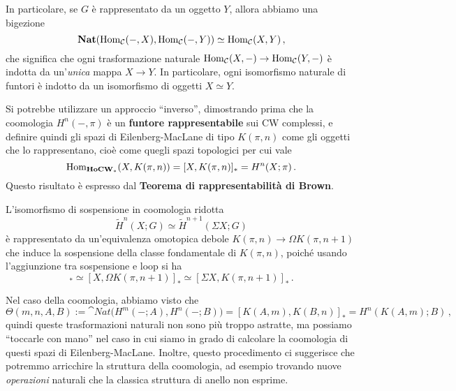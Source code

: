 In particolare, se $G$ è rappresentato da un oggetto $Y$,
allora abbiamo una bigezione
\begin{equation*}
	{\normalfont\textbf{Nat}}(\operatorname{Hom}_{\mathcal{C}}(-,X), \operatorname{Hom}_{\mathcal{C}}(-,Y)) \simeq \operatorname{Hom}_{\mathcal{C}}(X,Y)\,,
\end{equation*}
che significa che ogni trasformazione naturale $\operatorname{Hom}_{\mathcal{C}}(X,-) \to \operatorname{Hom}_{\mathcal{C}}(Y,-)$
è indotta da un'\emph{unica} mappa $X \to Y$.
In particolare, ogni isomorfismo naturale di funtori è indotto
da un isomorfismo di oggetti $X \simeq Y$.


\begin{fact}
Si potrebbe utilizzare un approccio ``inverso'',
dimostrando prima che la coomologia $H^{n}(-,\pi)$
è un \textbf{funtore rappresentabile} sui CW complessi,
e definire quindi gli spazi di Eilenberg-MacLane di tipo
$K(\pi,n)$ come gli oggetti che lo rappresentano,
cioè come quegli spazi topologici per cui vale
\begin{equation*}
	\operatorname{Hom}_{{\normalfont\textbf{HoCW}}_{\ast}}(X,K(\pi,n)) = [X,K(\pi,n)]_{\ast} = H^{n}(X;\pi)\,.
\end{equation*}
Questo risultato è espresso dal \textbf{Teorema di rappresentabilità di Brown}.
\end{fact}


\begin{oss}
	L'isomorfismo di sospensione in coomologia ridotta
	\begin{equation*}
		\widetilde{H}^{n}(X;G) \simeq \widetilde{H}^{n+1}(\Sigma X;G)
	\end{equation*}
	è rappresentato da un'equivalenza omotopica debole
		$K(\pi,n) \to \Omega K(\pi,n+1)$
	che induce la sospensione della classe fondamentale di $K(\pi,n)$,
	poiché usando l'aggiunzione tra sospensione e loop si ha
	\begin{equation*}
		 [X,K(\pi,n)]_{\ast} \simeq  [X,\Omega K(\pi,n+1)]_{\ast} \simeq  [\Sigma X,K(\pi,n+1)]_{\ast}\,.
	\end{equation*}
\end{oss}

Nel caso della coomologia, abbiamo visto che
\begin{equation*}
	\Theta(m,n,A,B) := \cat{Nat}\Big(H^{m}(-;A), H^{n}(-;B) \Big)
	= [K(A,m),K(B,n)]_{\ast} = H^{n}(K(A,m);B)\,,
\end{equation*}
quindi queste trasformazioni naturali non sono più
troppo astratte, ma possiamo ``toccarle con mano'' nel caso in
cui siamo in grado di calcolare la coomologia 
di questi spazi di Eilenberg-MacLane.
Inoltre, questo procedimento ci suggerisce che
potremmo arricchire la struttura
della coomologia, ad esempio trovando nuove \emph{operazioni}
naturali che la classica struttura di anello %
non esprime.


